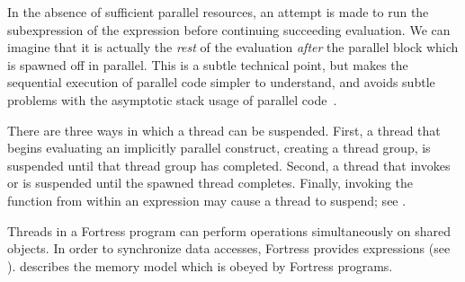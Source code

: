 In the absence of sufficient parallel resources, an attempt is made to
run the subexpression of the  expression before continuing
succeeding evaluation.  We can imagine that
it is actually the \emph{rest} of
the evaluation \emph{after} the parallel block which is spawned off
in parallel.  This is a subtle technical point, but makes the
sequential execution of parallel code simpler to understand, and
avoids subtle problems with the asymptotic stack usage of parallel
code~\cite{lazyTask,LazyThreads}.

\label{abort-thread}
There are three
ways in which a thread can be suspended.  First, a
thread that begins evaluating an implicitly parallel construct,
creating a thread group, is suspended until that thread group has
completed.  Second, a thread that invokes  or  is
suspended until the spawned thread completes.
Finally, invoking the
 function from within an  expression may cause
a thread to suspend; see .

Threads in a Fortress program can perform operations simultaneously on
shared objects.  In order to synchronize data accesses, Fortress
provides  expressions (see ).
 describes the memory model which is obeyed by
Fortress programs.




